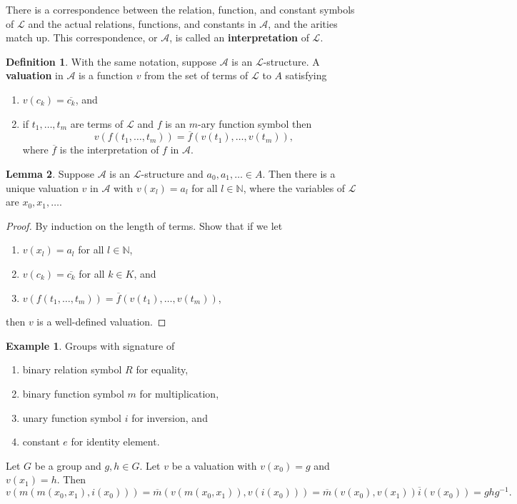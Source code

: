 \documentclass{article}
\newcommand{\N}{\mathbb{N}}
\newcommand{\A}{\mathcal{A}}
\renewcommand{\L}{\mathcal{L}}
\newcommand{\rb}[1]{\left( #1 \right)}
\theoremstyle{definition}\newtheorem{definition}{Definition}[subsection]
\theoremstyle{definition}\newtheorem{remark}[definition]{Remark}
\theoremstyle{definition}\newtheorem*{example}{Example}
\theoremstyle{definition}\newtheorem*{note}{Note}
\newtheorem{lemma}[definition]{Lemma}
\begin{document}
There is a correspondence between the relation, function, and constant symbols of $ \L $ and the actual relations, functions, and constants in $ \A $, and the arities match up. This correspondence, or $ \A $, is called an \textbf{interpretation} of $ \L $.

\begin{definition}
With the same notation, suppose $ \A $ is an $ \L $-structure. A \textbf{valuation} in $ \A $ is a function $ v $ from the set of terms of $ \L $ to $ A $ satisfying
\begin{enumerate}
\item $ v\rb{c_k} = \overline{c_k} $, and
\item if $ t_1, \dots, t_m $ are terms of $ \L $ and $ f $ is an $ m $-ary function symbol then
$$ v\rb{f\rb{t_1, \dots, t_m}} = \overline{f}\rb{v\rb{t_1}, \dots, v\rb{t_m}}, $$
where $ \overline{f} $ is the interpretation of $ f $ in $ \A $.
\end{enumerate}
\end{definition}

\begin{lemma}
Suppose $ \A $ is an $ \L $-structure and $ a_0, a_1, \dots \in A $. Then there is a unique valuation $ v $ in $ \A $ with $ v\rb{x_l} = a_l $ for all $ l \in \N $, where the variables of $ \L $ are $ x_0, x_1, \dots $.
\end{lemma}

\begin{proof}
By induction on the length of terms. Show that if we let
\begin{enumerate}
\item $ v\rb{x_l} = a_l $ for all $ l \in \N $,
\item $ v\rb{c_k} = \overline{c_k} $ for all $ k \in K $, and
\item $ v\rb{f\rb{t_1, \dots, t_m}} = \overline{f}\rb{v\rb{t_1}, \dots, v\rb{t_m}} $,
\end{enumerate}
then $ v $ is a well-defined valuation.
\end{proof}

\begin{example}
Groups with signature of
\begin{enumerate}
\item binary relation symbol $ R $ for equality,
\item binary function symbol $ m $ for multiplication,
\item unary function symbol $ i $ for inversion, and
\item constant $ e $ for identity element.
\end{enumerate}
Let $ G $ be a group and $ g, h \in G $. Let $ v $ be a valuation with $ v\rb{x_0} = g $ and $ v\rb{x_1} = h $. Then
$$ v\rb{m\rb{m\rb{x_0, x_1}, i\rb{x_0}}} = \overline{m}\rb{v\rb{m\rb{x_0, x_1}}, v\rb{i\rb{x_0}}} = \overline{m}\rb{v\rb{x_0}, v\rb{x_1}}\overline{i}\rb{v\rb{x_0}} = ghg^{-1}. $$
\end{example}
\end{document}
